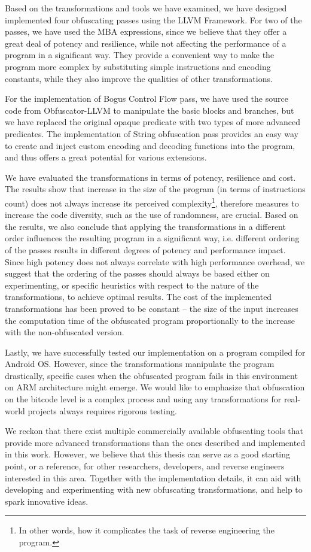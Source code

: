 \documentclass[
  digital, %
  notable,   %
  twoside, %
  nolof,     %
  nolot,     %
]{fithesis3}
\theoremstyle{definition}
\begin{document}
Based on the transformations and tools we have examined, we have designed implemented four obfuscating passes using the LLVM Framework. For two of the passes, we have used the MBA expressions, since we believe that they offer a great deal of potency and resilience, while not affecting the performance of a program in a significant way. They provide a convenient way to make the program more complex by substituting simple instructions and encoding constants, while they also improve the qualities of other transformations. 

For the implementation of Bogus Control Flow pass, we have used the source code from Obfuscator-LLVM to manipulate the basic blocks and branches, but we have replaced the original opaque predicate with two types of more advanced predicates. The implementation of String obfuscation pass provides an easy way to create and inject custom encoding and decoding functions into the program, and thus offers a great potential for various extensions. 

We have evaluated the transformations in terms of potency, resilience and cost. The results show that increase in the size of the program (in terms of instructions count) does not always increase its perceived complexity\footnote{In other words, how it complicates the task of reverse engineering the program.}, therefore measures to increase the code diversity, such as the use of randomness, are crucial. Based on the results, we also conclude that applying the transformations in a different order influences the resulting program in a significant way, i.e. different ordering of the passes results in different degrees of potency and performance impact. Since high potency does not always correlate with high performance overhead, we suggest that the ordering of the passes should always be based either on experimenting, or specific heuristics with respect to the nature of the transformations, to achieve optimal results. The cost of the implemented transformations has been proved to be constant -- the size of the input increases the computation time of the obfuscated program proportionally to the increase with the non-obfuscated version. 

Lastly, we have successfully tested our implementation on a program compiled for Android OS. However, since the transformations manipulate the program drastically, specific cases when the obfuscated program fails in this environment on ARM architecture might emerge. We would like to emphasize that obfuscation on the bitcode level is a complex process and using any transformations for real-world projects always requires rigorous testing. 

We reckon that there exist multiple commercially available obfuscating tools that provide more advanced transformations than the ones described and implemented in this work. However, we believe that this thesis can serve as a good starting point, or a reference, for other researchers, developers, and reverse engineers interested in this area. Together with the implementation details, it can aid with developing and experimenting with new obfuscating transformations, and help to spark innovative ideas. 

\printbibliography[heading=bibintoc] %
\end{document}
